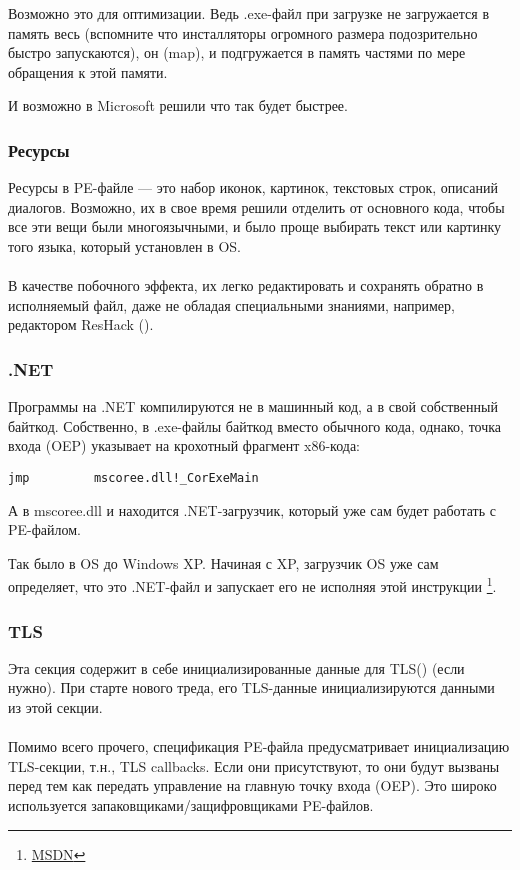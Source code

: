 Возможно это для оптимизации.
Ведь .exe-файл при загрузке не загружается в память весь 
(вспомните что инсталляторы огромного размера подозрительно быстро запускаются), он  (map), 
и подгружается в память частями по мере обращения к этой памяти.

И возможно в Microsoft решили что так будет быстрее.

\subsubsection{Ресурсы}

\label{PEresources}
Ресурсы в PE-файле --- это набор иконок, картинок, текстовых строк, описаний диалогов.
Возможно, их в свое время решили отделить от основного кода, чтобы все эти вещи были многоязычными,
и было проще выбирать текст или картинку того языка, который установлен в \ac{OS}. \\
\\
В качестве побочного эффекта, их легко редактировать и сохранять обратно в исполняемый файл,
даже не обладая специальными знаниями, например, редактором ResHack ().

\subsubsection{.NET}

Программы на .NET компилируются не в машинный код, а в свой собственный байткод.
Собственно, в .exe-файлы байткод вместо обычного кода, однако, точка входа (\ac{OEP}) 
указывает на крохотный фрагмент x86-кода:

\begin{lstlisting}
jmp         mscoree.dll!_CorExeMain
\end{lstlisting}

А в mscoree.dll и находится .NET-загрузчик, который уже сам будет работать с PE-файлом.

Так было в \ac{OS} до Windows XP. Начиная с XP, загрузчик \ac{OS} уже сам определяет, что это
.NET-файл и запускает его не исполняя этой инструкции \JMP
\footnote{\href{http://go.yurichev.com/17051}{MSDN}}.

\subsubsection{TLS}

Эта секция содержит в себе инициализированные данные для \ac{TLS}() (если нужно).
При старте нового треда, его \ac{TLS}-данные инициализируются данными из этой секции. \\
\\
Помимо всего прочего, спецификация PE-файла предусматривает инициализацию \ac{TLS}-секции, т.н., TLS callbacks.
Если они присутствуют, то они будут вызваны перед тем как передать управление на главную точку входа (\ac{OEP}).
Это широко используется запаковщиками/защифровщиками PE-файлов.

